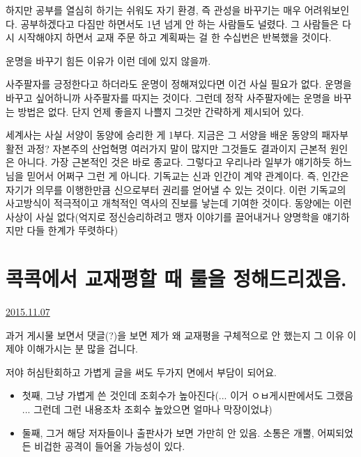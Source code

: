 하지만 공부를 열심히 하기는 쉬워도 자기 환경, 즉 관성을 바꾸기는 매우 어려워보인다.
공부하겠다고 다짐만 하면서도 1년 넘게 안 하는 사람들도 널렸다.
그 사람들은 다시 시작해야지 하면서 교재 주문 하고 계획짜는 걸 한 수십번은 반복했을 것이다.
\vspace{5mm}

운명을 바꾸기 힘든 이유가 이런 데에 있지 않을까.
\vspace{5mm}

사주팔자를 긍정한다고 하더라도 운명이 정해져있다면 이건 사실 필요가 없다.
운명을 바꾸고 싶어하니까 사주팔자를 따지는 것이다. 그런데 정작 사주팔자에는 운명을 바꾸는 방법은 없다.
단지 언제 좋을지 나쁠지 그것만 간략하게 제시되어 있다.
\vspace{5mm}

세계사는 사실 서양이 동양에 승리한 게 1부다. 지금은 그 서양을 배운 동양의 패자부활전 과정?
자본주의 산업혁명 여러가지 말이 많지만 그것들도 결과이지 근본적 원인은 아니다.
가장 근본적인 것은 바로 종교다. 그렇다고 우리나라 일부가 얘기하듯 하느님을 믿어서 어쩌구 그런 게 아니다.
기독교는 신과 인간이 계약 관계이다. 즉, 인간은 자기가 의무를 이행한만큼 신으로부터 권리를 얻어낼 수 있는 것이다.
이런 기독교의 사고방식이 적극적이고 개척적인 역사의 진보를 낳는데 기여한 것이다.
동양에는 이런 사상이 사실 없다(억지로 정신승리하려고 맹자 이야기를 끌어내거나 양명학을 얘기하지만 다들 한계가 뚜렷하다)
\vspace{5mm}














\section{콕콕에서 교재평할 때 룰을 정해드리겠음.}
\href{https://www.kockoc.com/Apoc/467585}{2015.11.07}

\vspace{5mm}

과거 게시물 보면서 댓글(?)을 보면 제가 왜 교재평을 구체적으로 안 했는지 그 이유 이제야 이해가시는 분 많을 겁니다.
\vspace{5mm}

저야 허심탄회하고 가볍게 글을 써도 두가지 면에서 부담이 되어요.
\vspace{5mm}
\begin{itemize}
    \item 첫째, 그냥 가볍게 쓴 것인데 조회수가 높아진다(... 이거 ㅇㅂ게시판에서도 그랬음 ... 그런데 그런 내용조차 조회수 높았으면 얼마나 막장이었냐)
    \item 둘째, 그거 해당 저자들이나 출판사가 보면 가만히 안 있음. 소통은 개뿔, 어찌되었든 비겁한 공격이 들어올 가능성이 있다.
\end{itemize}
\vspace{5mm}

